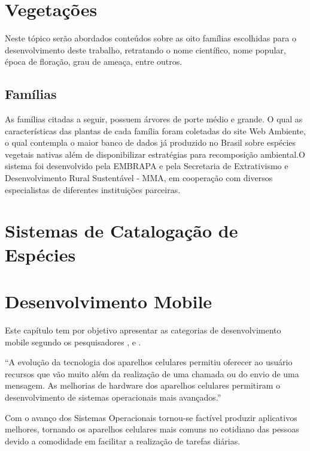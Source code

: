 \section{Vegetações}

Neste tópico serão abordados conteúdos sobre as oito famílias escolhidas para o desenvolvimento deste trabalho, retratando o nome científico, nome popular, época de floração, grau de ameaça, entre outros.

\subsection{Famílias}

As famílias citadas a seguir, possuem  árvores de porte médio e grande. O qual as características das plantas de cada família foram coletadas do site Web Ambiente, o qual contempla o maior banco de dados já produzido no Brasil sobre espécies vegetais nativas além de disponibilizar estratégias para recomposição ambiental.O sistema foi desenvolvido pela EMBRAPA e pela Secretaria de Extrativismo e Desenvolvimento Rural Sustentável - MMA, em cooperação com diversos especialistas de diferentes instituições parceiras.


\section{Sistemas de Catalogação de Espécies}

 
\section{Desenvolvimento Mobile}

Este capítulo tem por objetivo apresentar as categorias de desenvolvimento mobile segundo os pesquisadores ,  e .

\begin{citacao}
	“A evolução da tecnologia dos aparelhos celulares permitiu oferecer ao usuário recursos que vão muito além da realização de uma chamada ou do envio de uma mensagem. As melhorias de hardware dos aparelhos celulares permitiram o desenvolvimento de sistemas operacionais mais avançados.”\cite[]{da2014paradigmas}
\end{citacao}

Com o avanço dos Sistemas Operacionais tornou-se factível produzir aplicativos melhores, tornando os aparelhos celulares mais comuns no cotidiano das pessoas devido a comodidade em facilitar a realização de tarefas diárias.

